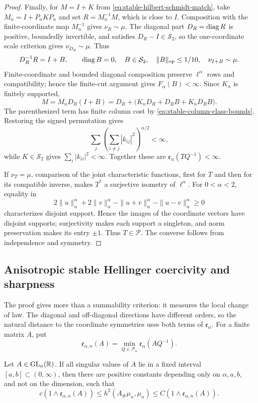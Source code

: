 \begin{proof}
Finally, for \(M=I+K\) from \eqref{eq:stable-hilbert-schmidt-match}, take
\(M_n=I+P_nKP_n\) and set \(R=M_n^{-1}M\), which is close to \(I\).
Composition with the finite-coordinate map \(M_n^{-1}\) gives
\(\nu_{R}\sim\mu\).  The diagonal part
\(D_R=\operatorname{diag} R\) is positive, boundedly invertible, and satisfies
\(D_R-I\in\mathcal S_2\), so the one-coordinate scale criterion gives
\(\nu_{D_R}\sim\mu\).  Thus
\[
 D_R^{-1}R=I+B,
 \qquad
 \operatorname{diag} B=0,\quad B\in\mathcal S_2,\quad
 \|B\|_{\mathrm{op}}\le1/10,\quad
 \nu_{I+B}\sim\mu.
\]
Finite-coordinate and bounded diagonal composition preserve \(\ell^\alpha\)
rows and compatibility; hence the finite-cut argument gives
\(F_\alpha(B)<\infty\).  Since \(K_n\) is finitely supported,
\[
 M=M_nD_R(I+B)
  =D_R+\bigl(K_nD_R+D_RB+K_nD_RB\bigr).
\]
The parenthesized term has finite column cost by
\eqref{eq:stable-column-class-bounds}.  Restoring the signed permutation gives
\[
 \sum_j\left(\sum_{i\ne j}|k_{ij}|^2\right)^{\alpha/2}<\infty,
\]
while \(K\in\mathcal S_2\) gives \(\sum_i|k_{ii}|^2<\infty\).  Together these
are \(\mathfrak e_\alpha(TQ^{-1})<\infty\).

If \(\nu_{T}=\mu\), comparison of the joint characteristic
functions, first for $T$ and then for its compatible inverse, makes $T^*$ a
surjective isometry of \(\ell^\alpha\).  For \(0<\alpha<2\), equality in
\[
 2\|u\|_\alpha^\alpha+2\|v\|_\alpha^\alpha
 -\|u+v\|_\alpha^\alpha-\|u-v\|_\alpha^\alpha\ge0
\]
characterizes disjoint support.  Hence the images of the coordinate vectors
have disjoint supports; surjectivity makes each support a singleton, and norm
preservation makes its entry \(\pm1\).  Thus \(T\in\mathcal P\).  The
converse follows from independence and symmetry.
\end{proof}

\subsection{Anisotropic stable Hellinger coercivity and sharpness}

The proof gives more than a summability criterion: it measures the local
change of law. The diagonal and off-diagonal directions have different
orders, so the natural distance to the coordinate symmetries uses both
terms of \(\mathfrak e_\alpha\). For a finite matrix \(A\), put
\[
 \mathfrak e_{\alpha,n}(A)
 =\min_{Q\in\mathcal P_n}\mathfrak e_\alpha(AQ^{-1}).
\]

\begin{proposition}
Let \(A\in\operatorname{GL}_n(\mathbb R)\).  If all singular values of \(A\) lie in a fixed interval
\([a,b]\subset(0,\infty)\), then there are positive constants depending only
on \(\alpha,a,b\), and not on the dimension, such that
\begin{equation}
 c(1\wedge\mathfrak e_{\alpha,n}(A))
 \le h^2(A_\#\mu_n,\mu_n)
 \le C(1\wedge\mathfrak e_{\alpha,n}(A)).
\end{equation}
\end{proposition}

